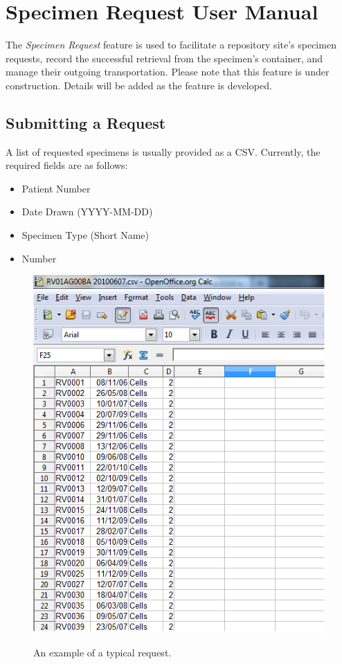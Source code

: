 \chapter{Specimen Request User Manual}

The \emph{Specimen Request} feature is used to facilitate a repository site's specimen requests, record the successful retrieval from the specimen's container, and manage their outgoing transportation. Please note that this feature is under construction. Details will be added as the feature is developed.

\section{Submitting a Request}

A list of requested specimens is usually provided as a CSV.  Currently, the required fields are as follows:

\begin{itemize}
\item Patient Number
\item Date Drawn (YYYY-MM-DD)
\item Specimen Type (Short Name)
\item Number
\end{itemize}

\begin{figure}[H]
      \centering
      \scalebox{0.7}
      { \includegraphics*{screenshots/specimen_request/csv.png} }
      \caption{An example of a typical request.}
      \label{Prepare CSV}
\end{figure}

